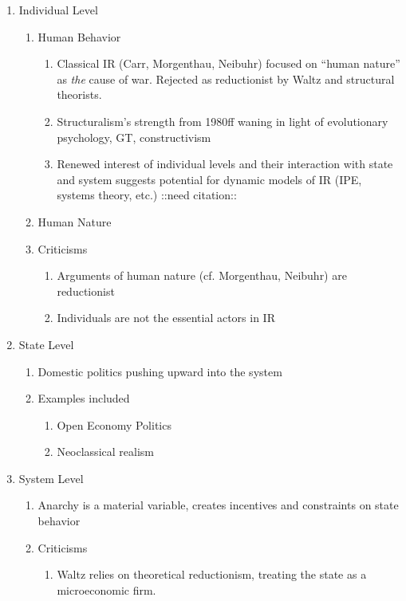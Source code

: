 \documentclass[11pt]{article}
\begin{document}
\begin{enumerate}
\item Individual Level
\begin{enumerate}
\item Human Behavior
\begin{enumerate}
\item Classical IR (Carr, Morgenthau, Neibuhr) focused on ``human
nature'' as \emph{the} cause of war. Rejected as reductionist by
Waltz and structural theorists.
\item Structuralism's strength from 1980ff waning in light of
evolutionary psychology, GT, constructivism
\item Renewed interest of individual levels and their interaction
with state and system suggests potential for dynamic models
of IR (IPE, systems theory, etc.) ::need citation::
\end{enumerate}
\item Human Nature
\item Criticisms
\begin{enumerate}
\item Arguments of human nature (cf. Morgenthau, Neibuhr) are
reductionist
\item Individuals are not the essential actors in IR
\end{enumerate}
\end{enumerate}
\item State Level
\begin{enumerate}
\item Domestic politics pushing upward into the system
\item Examples included
\begin{enumerate}
\item Open Economy Politics
\item Neoclassical realism
\end{enumerate}
\end{enumerate}

\item System Level
\begin{enumerate}
\item Anarchy is a material variable, creates incentives and
constraints on state behavior
\item Criticisms
\begin{enumerate}
\item Waltz relies on theoretical reductionism, treating the state
as a microeconomic firm.
\end{enumerate}
\end{enumerate}
\end{enumerate}
\end{document}
